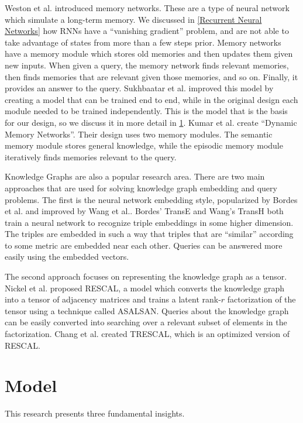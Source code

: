 \documentclass[pageno]{jpaper}
\begin{document}
Weston et al.\cite{Weston2015a} introduced memory networks. These are a type of
neural network which simulate a long-term memory. We discussed in \ref{Recurrent
Neural Networks} how RNNs have a ``vanishing gradient'' problem, and are not
able to take advantage of states from more than a few steps prior. Memory
networks have a memory module which stores old memories and then updates them
given new inputs. When given a query, the memory network finds relevant
memories, then finds memories that are relevant given those memories, and so on.
Finally, it provides an answer to the query. Sukhbaatar et
al.\cite{Sukhbaatar2015} improved this model by creating a model that can be
trained end to end, while in the original design each module needed to be
trained independently. This is the model that is the basis for our design, so we
discuss it in more detail in \ref{Model}. Kumar et al.\cite{Kumar2015} create
``Dynamic Memory Networks''. Their design uses two memory modules. The semantic
memory module stores general knowledge, while the episodic memory module
iteratively finds memories relevant to the query.

Knowledge Graphs are also a popular research area. There are two main approaches
that are used for solving knowledge graph embedding and query problems. The
first is the neural network embedding style, popularized by Bordes et
al.\cite{Bordes2013} and improved by Wang et al.\cite{Wang2014}. Bordes' TransE
and Wang's TransH both train a neural network to recognize triple embeddings in
some higher dimension. The triples are embedded in such a way that triples that
are ``similar'' according to some metric are embedded near each other. Queries
can be answered more easily using the embedded vectors.

The second approach focuses on representing the knowledge graph as a tensor.
Nickel et al.\cite{Nickel2011} proposed RESCAL, a model which converts the
knowledge graph into a tensor of adjacency matrices and trains a latent rank-$r$
factorization of the tensor using a technique called ASALSAN\cite{Bader2007}.
Queries about the knowledge graph can be easily converted into searching over a
relevant subset of elements in the factorization. Chang et al.\cite{Chang2014}
created TRESCAL, which is an optimized version of RESCAL.

\section{Model}
\label{Model}

This research presents three fundamental insights. \\
\end{document}
